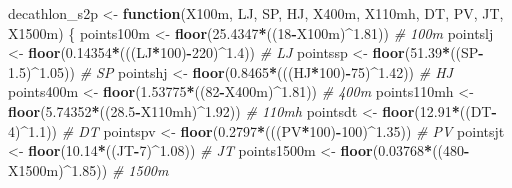 \documentclass[]{article}
\newenvironment{Shaded}{\begin{snugshade}}{\end{snugshade}}
\newcommand{\KeywordTok}[1]{\textcolor[rgb]{0.13,0.29,0.53}{\textbf{#1}}}
\newcommand{\DecValTok}[1]{\textcolor[rgb]{0.00,0.00,0.81}{#1}}
\newcommand{\FloatTok}[1]{\textcolor[rgb]{0.00,0.00,0.81}{#1}}
\newcommand{\StringTok}[1]{\textcolor[rgb]{0.31,0.60,0.02}{#1}}
\newcommand{\CommentTok}[1]{\textcolor[rgb]{0.56,0.35,0.01}{\textit{#1}}}
\newcommand{\ControlFlowTok}[1]{\textcolor[rgb]{0.13,0.29,0.53}{\textbf{#1}}}
\newcommand{\OperatorTok}[1]{\textcolor[rgb]{0.81,0.36,0.00}{\textbf{#1}}}
\newcommand{\NormalTok}[1]{#1}
\begin{document}
\begin{Shaded}
\begin{Highlighting}[]
\NormalTok{decathlon_s2p <-}\StringTok{ }\ControlFlowTok{function}\NormalTok{(X100m, LJ, SP, HJ, X400m, X110mh, DT, PV, JT, X1500m) \{}
\NormalTok{  points100m <-}\StringTok{ }\KeywordTok{floor}\NormalTok{(}\FloatTok{25.4347}\OperatorTok{*}\NormalTok{((}\DecValTok{18}\OperatorTok{-}\NormalTok{X100m)}\OperatorTok{^}\FloatTok{1.81}\NormalTok{)) }\CommentTok{# 100m}
\NormalTok{  pointslj <-}\StringTok{ }\KeywordTok{floor}\NormalTok{(}\FloatTok{0.14354}\OperatorTok{*}\NormalTok{(((LJ}\OperatorTok{*}\DecValTok{100}\NormalTok{)}\OperatorTok{-}\DecValTok{220}\NormalTok{)}\OperatorTok{^}\FloatTok{1.4}\NormalTok{)) }\CommentTok{# LJ}
\NormalTok{  pointssp <-}\StringTok{ }\KeywordTok{floor}\NormalTok{(}\FloatTok{51.39}\OperatorTok{*}\NormalTok{((SP}\OperatorTok{-}\FloatTok{1.5}\NormalTok{)}\OperatorTok{^}\FloatTok{1.05}\NormalTok{)) }\CommentTok{# SP}
\NormalTok{  pointshj <-}\StringTok{ }\KeywordTok{floor}\NormalTok{(}\FloatTok{0.8465}\OperatorTok{*}\NormalTok{(((HJ}\OperatorTok{*}\DecValTok{100}\NormalTok{)}\OperatorTok{-}\DecValTok{75}\NormalTok{)}\OperatorTok{^}\FloatTok{1.42}\NormalTok{)) }\CommentTok{# HJ}
\NormalTok{  points400m <-}\StringTok{ }\KeywordTok{floor}\NormalTok{(}\FloatTok{1.53775}\OperatorTok{*}\NormalTok{((}\DecValTok{82}\OperatorTok{-}\NormalTok{X400m)}\OperatorTok{^}\FloatTok{1.81}\NormalTok{)) }\CommentTok{# 400m}
\NormalTok{  points110mh <-}\StringTok{ }\KeywordTok{floor}\NormalTok{(}\FloatTok{5.74352}\OperatorTok{*}\NormalTok{((}\FloatTok{28.5}\OperatorTok{-}\NormalTok{X110mh)}\OperatorTok{^}\FloatTok{1.92}\NormalTok{)) }\CommentTok{# 110mh}
\NormalTok{  pointsdt <-}\StringTok{ }\KeywordTok{floor}\NormalTok{(}\FloatTok{12.91}\OperatorTok{*}\NormalTok{((DT}\OperatorTok{-}\DecValTok{4}\NormalTok{)}\OperatorTok{^}\FloatTok{1.1}\NormalTok{)) }\CommentTok{# DT}
\NormalTok{  pointspv <-}\StringTok{ }\KeywordTok{floor}\NormalTok{(}\FloatTok{0.2797}\OperatorTok{*}\NormalTok{(((PV}\OperatorTok{*}\DecValTok{100}\NormalTok{)}\OperatorTok{-}\DecValTok{100}\NormalTok{)}\OperatorTok{^}\FloatTok{1.35}\NormalTok{)) }\CommentTok{# PV}
\NormalTok{  pointsjt <-}\StringTok{ }\KeywordTok{floor}\NormalTok{(}\FloatTok{10.14}\OperatorTok{*}\NormalTok{((JT}\OperatorTok{-}\DecValTok{7}\NormalTok{)}\OperatorTok{^}\FloatTok{1.08}\NormalTok{)) }\CommentTok{# JT}
\NormalTok{  points1500m <-}\StringTok{ }\KeywordTok{floor}\NormalTok{(}\FloatTok{0.03768}\OperatorTok{*}\NormalTok{((}\DecValTok{480}\OperatorTok{-}\NormalTok{X1500m)}\OperatorTok{^}\FloatTok{1.85}\NormalTok{)) }\CommentTok{# 1500m}


\end{Highlighting}
\end{Shaded}
\end{document}
